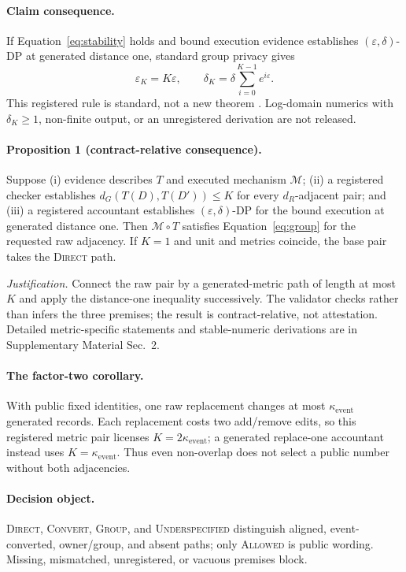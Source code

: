 \documentclass[letterpaper]{article} %
\newcommand{\Direct}{\textsc{Direct}}
\newcommand{\Convert}{\textsc{Convert}}
\newcommand{\Group}{\textsc{Group}}
\newcommand{\Under}{\textsc{Underspecified}}
\newcommand{\Allowed}{\textsc{Allowed}}
\newcommand{\ke}{\kappa_{\mathrm{event}}}
\begin{document}
\paragraph{Claim consequence.}
If Equation~\eqref{eq:stability} holds and bound execution evidence establishes $(\varepsilon,\delta)$-DP at generated distance one, standard group privacy gives
\begin{equation}
\varepsilon_K=K\varepsilon,\qquad
\delta_K=\delta\sum_{i=0}^{K-1}e^{i\varepsilon}.
\label{eq:group}
\end{equation}
This registered rule is standard, not a new theorem \citep{dwork2014foundations}. Log-domain numerics with $\delta_K\geq1$, non-finite output, or an unregistered derivation are not released.

\paragraph{Proposition 1 (contract-relative consequence).}
Suppose (i) evidence describes $T$ and executed mechanism $\mathcal M$; (ii) a registered checker establishes $d_G(T(D),T(D'))\leq K$ for every $d_R$-adjacent pair; and (iii) a registered accountant establishes $(\varepsilon,\delta)$-DP for the bound execution at generated distance one. Then $\mathcal M\!\circ T$ satisfies Equation~\eqref{eq:group} for the requested raw adjacency. If $K=1$ and unit and metrics coincide, the base pair takes the \Direct{} path.

\emph{Justification.}
Connect the raw pair by a generated-metric path of length at most $K$ and apply the distance-one inequality successively. The validator checks rather than infers the three premises; the result is contract-relative, not attestation.
Detailed metric-specific statements and stable-numeric derivations are in Supplementary Material Sec.~2.

\paragraph{The factor-two corollary.}
With public fixed identities, one raw replacement changes at most $\ke$ generated records. Each replacement costs two add/remove edits, so this registered metric pair licenses $K=2\ke$; a generated replace-one accountant instead uses $K=\ke$. Thus even non-overlap does not select a public number without both adjacencies.

\paragraph{Decision object.}
\Direct{}, \Convert{}, \Group{}, and \Under{} distinguish aligned, event-converted, owner/group, and absent paths; only \Allowed{} is public wording. Missing, mismatched, unregistered, or vacuous premises block.
\end{document}
